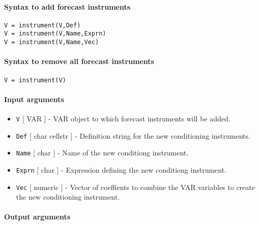 


	\paragraph{Syntax to add forecast
instruments}

\begin{verbatim}
V = instrument(V,Def)
V = instrument(V,Name,Exprn)
V = instrument(V,Name,Vec)
\end{verbatim}

\paragraph{Syntax to remove all forecast
instruments}

\begin{verbatim}
V = instrument(V)
\end{verbatim}

\paragraph{Input arguments}

\begin{itemize}
\item
  \texttt{V} {[} VAR {]} - VAR object to which forecast instruments will
  be added.
\item
  \texttt{Def} {[} char \textbar{} cellstr {]} - Definition string for
  the new conditioning instruments.
\item
  \texttt{Name} {[} char {]} - Name of the new conditiong instrument.
\item
  \texttt{Exprn} {[} char {]} - Expression defining the new conditiong
  instrument.
\item
  \texttt{Vec} {[} numeric {]} - Vector of coeffients to combine the VAR
  variables to create the new conditioning instrument.
\end{itemize}

\paragraph{Output arguments}


